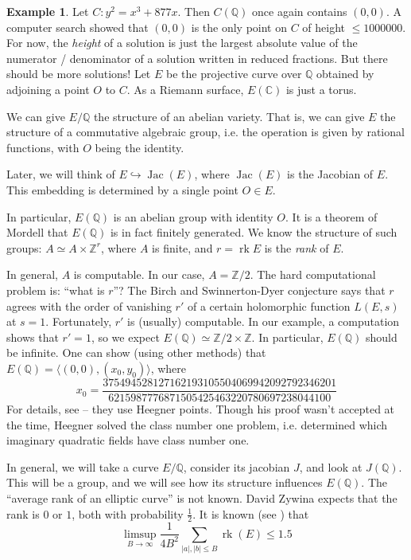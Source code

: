 \documentclass{article}
\theoremstyle{definition}
\newtheorem{example}[subsection]{Example}
\begin{document}
\begin{example}
Let $C:y^2=x^3+877 x$. Then $C(\mathbb{Q})$ once again contains $(0,0)$. A 
computer search showed that $(0,0)$ is the only point on $C$ of height 
$\leqslant 1000000$. For now, the \emph{height} of a solution is just the 
largest absolute value of the numerator / denominator of a solution written 
in reduced fractions. But there should be more solutions! Let $E$ be the 
projective curve over $\mathbb{Q}$ obtained by adjoining a point $O$ to $C$. 
As a Riemann surface, $E(\mathbb{C})$ is just a torus. 

We can give $E/\mathbb{Q}$ the structure of an abelian variety. That is, 
we can give $E$ the structure of a commutative algebraic group, i.e. the 
operation is given by rational functions, with $O$ being the identity. 

Later, we will think of $E\hookrightarrow \operatorname{Jac}(E)$, where 
$\operatorname{Jac}(E)$ is the Jacobian of $E$. This embedding is determined 
by a single point $O\in E$. 

In particular, $E(\mathbb{Q})$ is an abelian group with identity $O$. It is 
a theorem of Mordell that $E(\mathbb{Q})$ is in fact finitely generated. We 
know the structure of such groups: $A\simeq A\times \mathbb{Z}^r$, where 
$A$ is finite, and $r=\operatorname{rk} E$ is the \emph{rank} of $E$. 

In general, $A$ is computable. In our case, $A=\mathbb{Z}/2$. The hard 
computational problem is: ``what is $r$''? The Birch and Swinnerton-Dyer 
conjecture says that $r$ agrees with the order of vanishing $r'$ of a certain 
holomorphic function $L(E,s)$ at $s=1$. Fortunately, $r'$ is (usually) 
computable. In our example, a computation shows that $r'=1$, so we expect 
$E(\mathbb{Q})\simeq \mathbb{Z}/2\times\mathbb{Z}$. In particular, 
$E(\mathbb{Q})$ should be infinite. One can show (using other methods) that 
$E(\mathbb{Q})=\langle (0,0),(x_0,y_0)\rangle$, where 
\[
  x_0 = \frac{37 5494 5281 2716 2193 1055 0406 9942 0927 9234 6201}{6215 9877 7687 1505 4254 6322 0780 6972 3804 4100}
\]
For details, see \cite{br84} -- they use Heegner points. Though his proof wasn't 
accepted at the time, Heegner solved the class number one problem, i.e. 
determined which imaginary quadratic fields have class number one. 
\end{example}

In general, we will take a curve $E/\mathbb{Q}$, consider its jacobian $J$, 
and look at $J(\mathbb{Q})$. This will be a group, and we will see how its 
structure influences $E(\mathbb{Q})$. The ``average rank of an elliptic 
curve'' is not known. David Zywina expects that the rank is $0$ or $1$, both 
with probability $\frac 1 2$. It is known (see \cite{bh10}) that 
\[
  \limsup_{B\to\infty} \frac{1}{4 B^2} \sum_{|a|,|b|\leqslant B} \operatorname{rk}(E) \leqslant 1.5
\]
\end{document}
